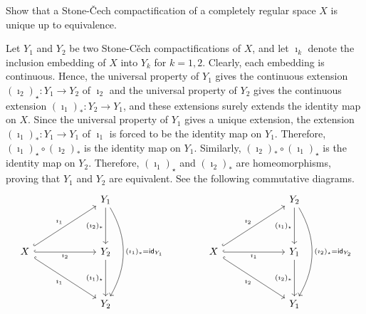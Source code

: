 \begin{prob}
    Show that a Stone-\v{C}ech compactification of a completely regular space $X$ is unique up to equivalence.
\end{prob}
\begin{sol}
    Let $Y_1$ and $Y_2$ be two Stone-C\v{e}ch compactifications of $X$, and let $\imath_k$ denote the inclusion embedding of $X$ into $Y_k$ for $k=1, 2$.
    Clearly, each embedding is continuous.
    Hence, the universal property of $Y_1$ gives the continuous extension $(\imath_2)_\star: Y_1\rightarrow Y_2$ of $\imath_2$ and the universal property of $Y_2$ gives the continuous extension $(\imath_1)_*: Y_2\rightarrow Y_1$, and these extensions surely extends the identity map on $X$.
    Since the universal property of $Y_1$ gives a unique extension, the extension $(\imath_1)_*: Y_1\rightarrow Y_1$ of $\imath_1$ is forced to be the identity map on $Y_1$.
    Therefore, $(\imath_1)_\star\circ(\imath_2)_*$ is the identity map on $Y_1$.
    Similarly, $(\imath_2)_*\circ(\imath_1)_\star$ is the identity map on $Y_2$.
    Therefore, $(\imath_1)_\star$ and $(\imath_2)_*$ are homeomorphisms, proving that $Y_1$ and $Y_2$ are equivalent.
    See the following commutative diagrams.
    \begin{equation*}
    \begin{tikzcd}[row sep=1.3cm, column sep=2.2cm]
        & Y_1\arrow[d, "(\imath_2)_*"']\arrow[dd, bend left, "(\imath_1)_*=\textsf{id}_{Y_1}"]\\
        X
        \arrow[ur, "\imath_1", hook]
        \arrow[r, "\imath_2"', hook]
        \arrow[dr, "\imath_1"', hook]
        & Y_2\arrow[d, "(\imath_1)_\star"']\\
        & Y_2
    \end{tikzcd}
    \qquad\qquad
    \begin{tikzcd}[row sep=1.3cm, column sep=2.2cm]
        & Y_2\arrow[d, "(\imath_1)_\star"']\arrow[dd, bend left, "(\imath_2)_\star=\textsf{id}_{Y_2}"]\\
        X
        \arrow[ur, "\imath_2", hook]
        \arrow[r, "\imath_1"', hook]
        \arrow[dr, "\imath_2"', hook]
        & Y_1\arrow[d, "(\imath_2)_*"']\\
        & Y_1
    \end{tikzcd}
    \end{equation*}
\end{sol}